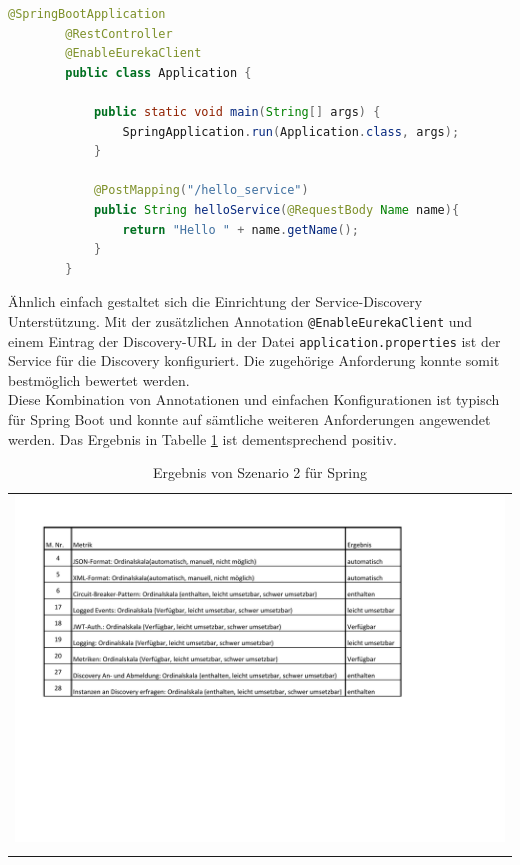 \begin{minipage}{\linewidth}
	\begin{lstlisting}[caption={"Hello-Word" in Spring},label=SpringHello,language=JAVA] 
		@SpringBootApplication
		@RestController
		@EnableEurekaClient
		public class Application {
		
			public static void main(String[] args) {
				SpringApplication.run(Application.class, args);
			}
			
			@PostMapping("/hello_service")
			public String helloService(@RequestBody Name name){
				return "Hello " + name.getName();
			}
		}
	\end{lstlisting}
\end{minipage}

Ähnlich einfach gestaltet sich die Einrichtung der Service-Discovery Unterstützung. Mit der zusätzlichen Annotation \lstinline|@EnableEurekaClient| und einem Eintrag der Discovery-URL in der Datei \lstinline|application.properties| ist der Service für die Discovery konfiguriert. Die zugehörige Anforderung konnte somit bestmöglich bewertet werden. \\
Diese Kombination von Annotationen und einfachen Konfigurationen ist typisch für Spring Boot und konnte auf sämtliche weiteren Anforderungen angewendet werden. Das Ergebnis in Tabelle \ref{Sz2ErgebnisSpring} ist dementsprechend positiv.

\begin{longtable}{c}
	\includegraphics[width=\linewidth]{Bilder/Sz2ErgebnisSpring.pdf} \\	
	\caption[Szenario 2 Ergebnis Spring]{Ergebnis von Szenario 2 für Spring}
	\label{Sz2ErgebnisSpring}\\
\end{longtable}
\FloatBarrier

